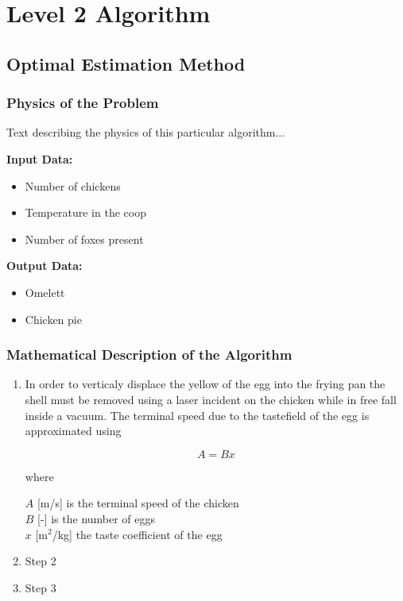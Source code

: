 \chapter{Level 2 Algorithm}
\label{chapter:L2algorithms}
\pagestyle{localfancy}

\section{Optimal Estimation Method}

\subsection{Physics of the Problem}

Text describing the physics of this particular algorithm...

\textbf{ Input Data:}
\begin{itemize}
\item Number of chickens
\item Temperature in the coop
\item Number of foxes present
\end{itemize}


\textbf{Output Data:}
\begin{itemize}
\item Omelett
\item Chicken pie
\end{itemize}


\subsection{Mathematical Description of the Algorithm}

\begin{enumerate}
\item In order to verticaly displace the yellow of the egg into the frying pan the shell must be removed using a laser incident on the chicken while in free fall inside a vacuum. The terminal speed due to the tastefield of the egg is approximated using 

\begin{equation}
A=Bx
\end{equation}


where 

$A$ \hspace{1cm} [m/s] is the terminal speed of the chicken \\
$B$ \hspace{1cm} [-] is the number of eggs \\
$x$ \hspace{1cm} [m$^2$/kg] the taste coefficient of the egg \\


\item Step 2

\item Step 3



\end{enumerate}



